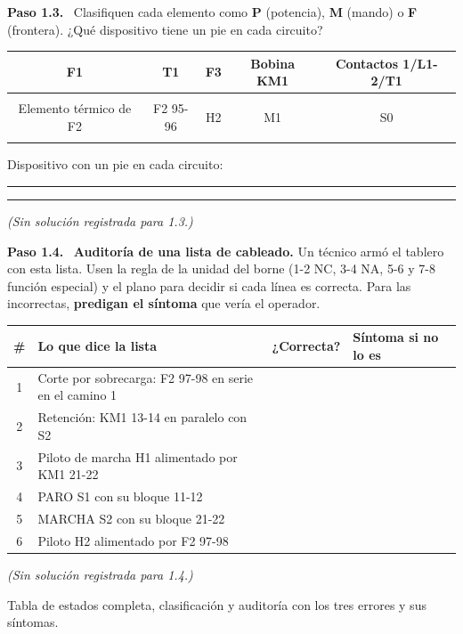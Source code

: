 \documentclass[11pt,a4paper]{article}
\makeatletter
\newif\ifdocente
\newcommand{\solucion}[1]{%
  \ifdocente
    \ifcsname sol@#1\endcsname
      \begin{solucionbox}\small\csname sol@#1\endcsname\end{solucionbox}%
    \else
      \begin{solucionbox}\small\textit{(Sin solución registrada para #1.)}\end{solucionbox}%
    \fi
  \fi}
\newcommand{\blanco}{\rule[-1pt]{1.4cm}{0.4pt}}
\newcommand{\paso}[1]{\par\needspace{4\baselineskip}\noindent\textbf{\color{navy}Paso #1.}\ }
\newcommand{\renglon}{\rule[-0.42cm]{0pt}{1.1cm}}
\makeatother
\begin{document}
\paso{1.3} Clasifiquen cada elemento como \textbf{P} (potencia), \textbf{M} (mando) o \textbf{F} (frontera). ¿Qué dispositivo tiene un pie en cada circuito?

\begin{center}\small\renewcommand{\arraystretch}{1.3}
\begin{tabularx}{\linewidth}{@{}|C|C|C|C|C|@{}}
\hline
F1 & T1 & F3 & Bobina KM1 & Contactos 1/L1-2/T1\\\hline
\renglon & & & & \\\hline
Elemento térmico de F2 & F2 95-96 & H2 & M1 & S0\\\hline
\renglon & & & & \\\hline
\end{tabularx}
\end{center}
Dispositivo con un pie en cada circuito: \blanco\blanco
\solucion{1.3}

\paso{1.4} \textbf{Auditoría de una lista de cableado.} Un técnico armó el tablero con esta lista. Usen la regla de la unidad del borne (1-2 NC, 3-4 NA, 5-6 y 7-8 función especial) y el plano para decidir si cada línea es correcta. Para las incorrectas, \textbf{predigan el síntoma} que vería el operador.

\begin{center}\small\renewcommand{\arraystretch}{1.4}
\begin{tabularx}{\linewidth}{@{}c p{6.2cm} >{\centering\arraybackslash\renglon}p{1.7cm} W@{}}
\toprule
\textbf{\#} & \textbf{Lo que dice la lista} & \textbf{¿Correcta?} & \textbf{Síntoma si no lo es}\\
 & Corte por sobrecarga: F2 97-98 en serie en el camino 1 & & \\
2 & Retención: KM1 13-14 en paralelo con S2 & & \\
3 & Piloto de marcha H1 alimentado por KM1 21-22 & & \\
4 & PARO S1 con su bloque 11-12 & & \\
5 & MARCHA S2 con su bloque 21-22 & & \\
6 & Piloto H2 alimentado por F2 97-98 & & \\
\bottomrule
\end{tabularx}
\end{center}
\solucion{1.4}

\begin{evidencia}
Tabla de estados completa, clasificación y auditoría con los tres errores y sus síntomas.
\end{evidencia}
\end{document}
